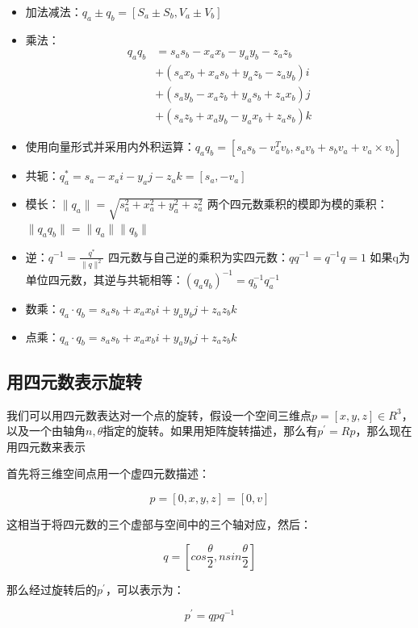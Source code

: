 \begin{itemize}
    \item 加法减法：$q_a \pm q_b = [S_a \pm S_b, V_a \pm V_b]$
    \item 乘法：
    $$\begin{aligned}
        q_aq_b &= s_as_b - x_ax_b - y_ay_b - z_az_b \\
               &+ (s_ax_b + x_as_b + y_az_b - z_ay_b)i \\
               &+ (s_ay_b - x_az_b + y_as_b + z_ax_b)j \\
               &+ (s_az_b + x_ay_b - y_ax_b + z_as_b)k
    \end{aligned}$$
    \item 使用向量形式并采用内外积运算：$q_aq_b = [s_as_b - v_a^Tv_b, s_av_b + s_bv_a + v_a \times v_b]$
    \item 共轭：$q_a^* = s_a - x_ai - y_aj - z_ak = [s_a, -v_a]$
    \item 模长：$\rVert{q_a}\rVert = \sqrt{s_a^2 + x_a^2 + y_a^2 + z_a^2}$
    \subitem 两个四元数乘积的模即为模的乘积：$\rVert{q_aq_b}\rVert = \rVert{q_a}\rVert \rVert{q_b}\rVert$ 
    \item 逆：$q^{-1} = \frac{q^*}{\rVert{q}\rVert^2}$
    \subitem 四元数与自己逆的乘积为实四元数：$qq^{-1} = q^{-1}q = 1$
    \subitem 如果q为单位四元数，其逆与共轭相等：$(q_aq_b)^{-1} = q_b^{-1}q_a^{-1}$
    \item 数乘：$q_a \cdot q_b = s_as_b + x_ax_bi + y_ay_bj + z_az_bk$
    \item 点乘：$q_a \cdot q_b = s_as_b + x_ax_bi + y_ay_bj + z_az_bk$
\end{itemize}

\subsection{用四元数表示旋转}

    我们可以用四元数表达对一个点的旋转，假设一个空间三维点$p = [x, y, z] \in R^3$，以及一个由轴角$n, \theta$指定的旋转。如果用矩阵旋转描述，那么有$p^{'} = Rp$，那么现在用四元数来表示

    首先将三维空间点用一个虚四元数描述：

$$
    p = [0, x, y, z] = [0, v]
$$

    这相当于将四元数的三个虚部与空间中的三个轴对应，然后：

$$
    q = [cos\frac{\theta}{2}, nsin\frac{\theta}{2}]
$$

    那么经过旋转后的$p^{'}$，可以表示为：

$$
    p^{'} = qpq^{-1}
$$